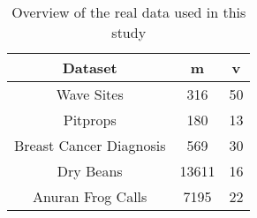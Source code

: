 \begin{table}
	\begin{center}
		\begin{tabular}{c|c|c}
			Dataset & m & v \\
			\hline
			Wave Sites & 316 & 50 \\
			Pitprops & 180 & 13 \\
			Breast Cancer Diagnosis & 569 & 30 \\
			Dry Beans & 13611 & 16 \\
			Anuran Frog Calls & 7195 & 22 \\
		\end{tabular}
	\end{center}
	\caption{Overview of the real data used in this study}
\end{table}